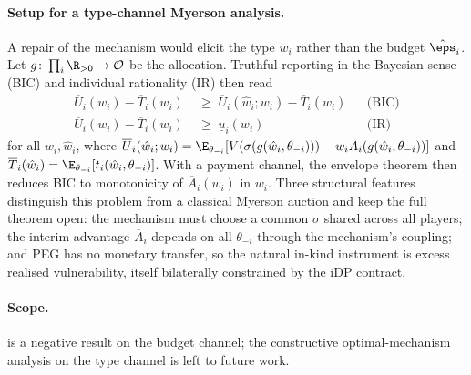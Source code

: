 \paragraph{Setup for a type-channel Myerson analysis.}
A repair of the mechanism would elicit the type $w_i$ rather than the
budget $\hat\eps_i$. Let $g\colon \prod_i \R_{>0} \to \mathcal{O}$ be
the allocation. Truthful reporting in the Bayesian sense (BIC) and
individual rationality (IR) then read
\begin{align*}
\overline{U}_i(w_i) - \overline{T}_i(w_i)
&\;\ge\;
\overline{U}_i(\hat w_i; w_i) - \overline{T}_i(\hat w_i)
&& \text{(BIC)} \\
\overline{U}_i(w_i) - \overline{T}_i(w_i)
&\;\ge\; \underline{u}_i(w_i)
&& \text{(IR)}
\end{align*}
for all $w_i, \hat w_i$, where $\overline{U}_i(\hat w_i; w_i) =
\E_{\theta_{-i}}[V(\sigma(g(\hat w_i, \theta_{-i}))) - w_i A_i(g(\hat
w_i, \theta_{-i}))]$ and $\overline{T}_i(\hat w_i) =
\E_{\theta_{-i}}[t_i(\hat w_i, \theta_{-i})]$. With a payment channel,
the envelope theorem then reduces BIC to monotonicity of
$\overline{A}_i(w_i)$ in $w_i$. Three structural features distinguish
this problem from a classical Myerson auction and keep the full theorem
open: the mechanism must choose a common $\sigma$ shared across all
players; the interim advantage $\overline{A}_i$ depends on all
$\theta_{-i}$ through the mechanism's coupling; and PEG has no monetary
transfer, so the natural in-kind instrument is excess realised
vulnerability, itself bilaterally constrained by the iDP contract.

\paragraph{Scope.}  is a negative result
on the budget channel; the constructive optimal-mechanism analysis on
the type channel is left to future work.
